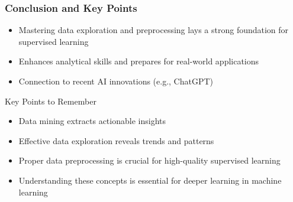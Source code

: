 \documentclass[aspectratio=169]{beamer}
\begin{document}
\begin{frame}[fragile]
    \frametitle{Conclusion and Key Points}
    \begin{itemize}
        \item Mastering data exploration and preprocessing lays a strong foundation for supervised learning
        \item Enhances analytical skills and prepares for real-world applications
        \item Connection to recent AI innovations (e.g., ChatGPT)
    \end{itemize}
    \begin{block}{Key Points to Remember}
        \begin{itemize}
            \item Data mining extracts actionable insights
            \item Effective data exploration reveals trends and patterns
            \item Proper data preprocessing is crucial for high-quality supervised learning
            \item Understanding these concepts is essential for deeper learning in machine learning
        \end{itemize}
    \end{block}
\end{frame}
\end{document}
